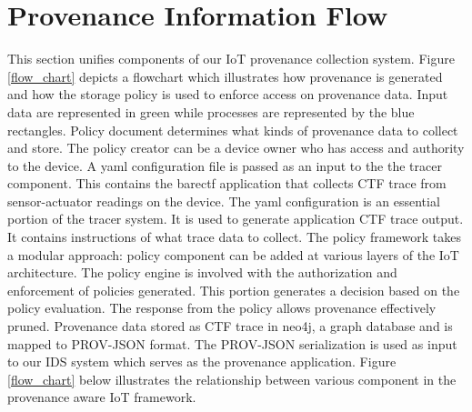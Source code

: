 \section{Provenance Information Flow}

This section unifies components of our IoT provenance collection system. Figure \ref{flow_chart} depicts a flowchart which illustrates how provenance is generated and how the storage policy is used to enforce access on provenance data. Input data are represented in green while processes are represented by the blue rectangles. Policy document determines what kinds of provenance data to collect and store. The policy creator can be a device owner who has access and authority to the device. A yaml configuration file is passed as an input to the the tracer component. This contains the barectf application that collects CTF trace from sensor-actuator readings on the device. The yaml configuration is an essential portion of the tracer system.  It is used to generate application CTF trace output. It contains instructions of what trace data to collect. The policy framework takes a modular approach: policy component can be added at various layers of the IoT architecture. The policy engine is involved with the authorization and enforcement of policies generated. This portion generates a decision based on the policy evaluation. The response from the policy allows provenance effectively pruned. Provenance data stored as CTF trace in neo4j, a graph database and is mapped to PROV-JSON format. The PROV-JSON serialization is used as input to our IDS system which serves as the provenance application. Figure \ref{flow_chart} below illustrates the relationship between various component in the provenance aware IoT framework.

